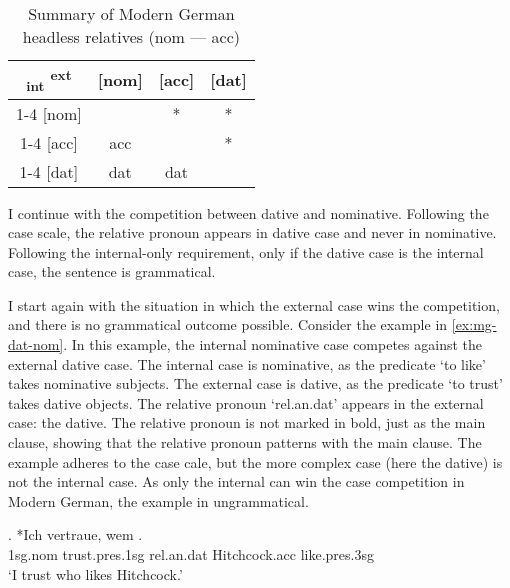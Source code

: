  \begin{table}[H]
   \center
   \caption{Summary of Modern German headless relatives (\ac{nom} --- \ac{acc})}
   \begin{tabular}{c|c|c|c}
     \toprule
     \textsubscript{\ac{int}} \textsuperscript{\ac{ext}}
            & [\ac{nom}]
            & [\ac{acc}]
            & [\ac{dat}]
            \\ \cmidrule{1-4}
        [\ac{nom}]
            & \xcancel{\phantom{xx}}
            & \cellcolor{LG}*
            & *
            \\ \cmidrule{1-4}
        [\ac{acc}]
            & \cellcolor{DG}\ac{acc}
            & \xcancel{\phantom{xx}}
            & *
            \\ \cmidrule{1-4}
        [\ac{dat}]
            & \ac{dat}
            & \ac{dat}
            & \xcancel{\phantom{xx}}
            \\
      \bottomrule
   \end{tabular}
     \label{tbl:case-competition-mg-nom-acc}
 \end{table}

I continue with the competition between dative and nominative. Following the case scale, the relative pronoun appears in dative case and never in nominative. Following the internal-only requirement, only if the dative case is the internal case, the sentence is grammatical.

I start again with the situation in which the external case wins the competition, and there is no grammatical outcome possible.
Consider the example in \ref{ex:mg-dat-nom}. In this example, the internal nominative case competes against the external dative case.
The internal case is nominative, as the predicate  `to like' takes nominative subjects.
The external case is dative, as the predicate  `to trust' takes dative objects.
The relative pronoun  `\ac{rel}.\ac{an}.\ac{dat}' appears in the external case: the dative. The relative pronoun is not marked in bold, just as the main clause, showing that the relative pronoun patterns with the main clause.
The example adheres to the case cale, but the more complex case (here the dative) is not the internal case. As only the internal can win the case competition in Modern German, the example in ungrammatical.

\exg. *Ich vertraue, wem  .\\
1\ac{sg}.\ac{nom} trust.\ac{pres}.1\ac{sg}\scsub{[dat]} \ac{rel}.\ac{an}.\ac{dat} Hitchcock.\ac{acc} like.\ac{pres}.3\ac{sg}\scsub{[nom]}\\
`I trust who likes Hitchcock.' \label{ex:mg-dat-nom}

